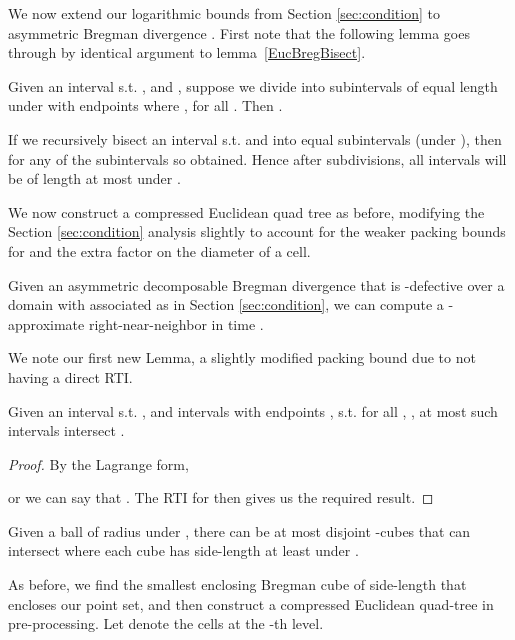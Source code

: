 \documentclass[11pt]{myclass}
\begin{document}
We now extend our logarithmic bounds from Section \ref{sec:condition} 
to asymmetric Bregman divergence .
First note that the following lemma goes through by identical argument 
to lemma~\ref{EucBregBisect}.
\begin{lemma}\label{EucABregBisect}
Given an interval  s.t. ,  and , suppose we divide  into  subintervals of equal length under  with endpoints  where , for all . Then .
\end{lemma}
\begin{corollary}\label{repabis}
If we recursively bisect an interval  
s.t.  and  into  equal subintervals (under ), then  for any of the subintervals  so obtained.
Hence after  subdivisions, all intervals will be of length at most  under .
\end{corollary}

We now construct a compressed Euclidean quad tree as before, 
modifying the Section \ref{sec:condition} analysis slightly 
to account for the weaker packing bounds for  and the extra  factor on the diameter of a cell. 

\begin{theorem}
  Given an asymmetric decomposable Bregman 
divergence  that is -defective over a domain  with associated 
 as in Section \ref{sec:condition}, we can compute a -approximate right-near-neighbor in 
time .
\end{theorem}



We note our first new Lemma, a slightly modified packing bound due to  not having a direct RTI.

\begin{lemma}\label{cpack}
 Given an interval  s.t. , and 
intervals with endpoints , s.t. for all , , 
at most  such intervals intersect .
\end{lemma}

\begin{proof}
By the Lagrange form, 

or we can say that .
The RTI for  then gives us the required result.
\end{proof}

\begin{corollary}\label{cpackd}
 Given a ball  of radius  under , there can be at most
 disjoint -cubes that can intersect  where each cube has 
side-length at least  under .
\end{corollary}


 As before, we  find the smallest enclosing Bregman cube of side-length 
that encloses our point set, and then construct a compressed Euclidean quad-tree in
pre-processing. Let  denote the cells at the -th level. 
\end{document}
